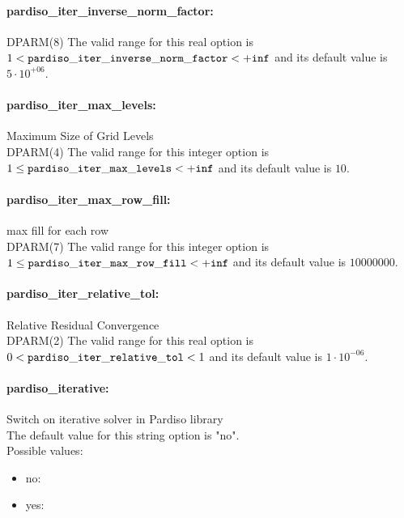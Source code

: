 \paragraph{pardiso\_iter\_inverse\_norm\_factor:}\label{sec:pardiso_iter_inverse_norm_factor}  $\;$ \\
 DPARM(8) The valid range for this real option is 
$1 <  {\tt pardiso\_iter\_inverse\_norm\_factor } <  {\tt +inf}$
and its default value is $5 \cdot 10^{+06}$.


\paragraph{pardiso\_iter\_max\_levels:}\label{sec:pardiso_iter_max_levels} Maximum Size of Grid Levels $\;$ \\
 DPARM(4) The valid range for this integer option is
$1 \le {\tt pardiso\_iter\_max\_levels } <  {\tt +inf}$
and its default value is $10$.


\paragraph{pardiso\_iter\_max\_row\_fill:}\label{sec:pardiso_iter_max_row_fill} max fill for each row $\;$ \\
 DPARM(7) The valid range for this integer option is
$1 \le {\tt pardiso\_iter\_max\_row\_fill } <  {\tt +inf}$
and its default value is $10000000$.


\paragraph{pardiso\_iter\_relative\_tol:}\label{sec:pardiso_iter_relative_tol} Relative Residual Convergence $\;$ \\
 DPARM(2) The valid range for this real option is 
$0 <  {\tt pardiso\_iter\_relative\_tol } <  1$
and its default value is $1 \cdot 10^{-06}$.


\paragraph{pardiso\_iterative:}\label{sec:pardiso_iterative} Switch on iterative solver in Pardiso library $\;$ \\

The default value for this string option is "no".
\\ 
Possible values:
\begin{itemize}
   \item no: 
   \item yes: 
\end{itemize}

